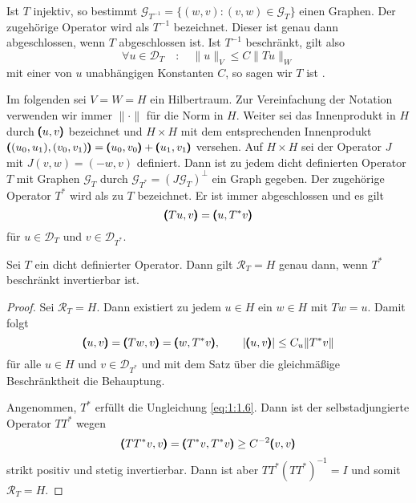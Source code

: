 Ist $T$ injektiv, so bestimmt $\mathcal G_{T^{-1}} = \{ (w,v) : (v,w)\in\mathcal G_T\}$ einen Graphen. Der zugehörige Operator wird als $T^{-1}$ bezeichnet. Dieser ist genau dann abgeschlossen, wenn $T$ abgeschlossen ist. Ist $T^{-1}$ beschränkt, gilt also
\begin{equation}\label{eq:1:1.6} 
   \forall u\in\mathcal D_T \quad:\quad \|u\|_V\le C \|Tu\|_W
\end{equation}
mit einer von $u$ unabhängigen Konstanten $C$, so sagen wir $T$ ist .

Im folgenden sei $V=W=H$ ein Hilbertraum. Zur Vereinfachung der Notation verwenden wir immer $\|\cdot\|$ f\"ur die Norm in $H$. Weiter sei das Innenprodukt in $H$ durch $\pmb(u,v\pmb)$ bezeichnet und $H\times H$ mit dem entsprechenden Innenprodukt $\pmb((u_0,u_1),(v_0,v_1)\pmb) = \pmb(u_0,v_0\pmb) + \pmb(u_1,v_1\pmb)$ versehen. Auf $H\times H$ sei der Operator $J$ mit $J(v,w) = (-w,v)$ definiert. Dann ist zu jedem dicht definierten Operator $T$ mit Graphen $\mathcal G_T$ durch $\mathcal G_{T^*}=(J\mathcal G_T)^\perp$ ein Graph gegeben. Der zugeh\"orige Operator $T^*$ wird als zu $T$  bezeichnet. Er ist immer abgeschlossen und es gilt
\begin{equation}
   \pmb(Tu,v\pmb) = \pmb(u,T^*v\pmb)
\end{equation}
f\"ur $u\in\mathcal D_T$ und $v\in\mathcal D_{T^*}$.

\begin{thm}\label{thm:1:1.2}
Sei $T$ ein dicht definierter Operator. Dann gilt $\mathcal R_T=H$ genau dann, wenn 
$T^*$ beschränkt invertierbar ist.
\end{thm}
\begin{proof}
Sei $\mathcal R_T=H$. Dann existiert zu jedem $u\in H$ ein $w\in H$ mit $Tw=u$. Damit folgt
\begin{equation}
   \pmb(u,v\pmb) = \pmb(Tw,v\pmb) = \pmb(w,T^*v\pmb), \qquad |\pmb(u,v\pmb)| \le C_u \|T^*v\|
\end{equation}
f\"ur alle $u\in H$ und $v\in\mathcal D_{T^*}$ und mit dem Satz über die gleichmäßige Beschränktheit die Behauptung.

Angenommen, $T^*$ erf\"ullt die Ungleichung \eqref{eq:1:1.6}. Dann ist der selbstadjungierte Operator $TT^*$ wegen
\begin{equation}
  \pmb(TT^*v,v\pmb) = \pmb(T^*v,T^*v\pmb) \ge C^{-2} \pmb(v,v\pmb)
\end{equation}
strikt positiv und stetig invertierbar. Dann ist aber $TT^* (TT^*)^{-1}  = I$ und somit $\mathcal R_T = H$.
\end{proof}

